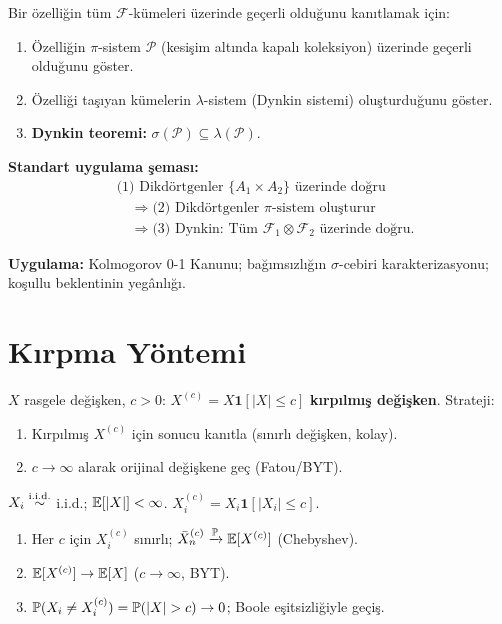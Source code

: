 Bir özelliğin tüm $\mathcal{F}$-kümeleri üzerinde geçerli olduğunu kanıtlamak için:

\begin{enumerate}
  \item Özelliğin $\pi$-sistem $\mathcal{P}$ (kesişim altında kapalı koleksiyon) üzerinde geçerli olduğunu göster.
  \item Özelliği taşıyan kümelerin $\lambda$-sistem (Dynkin sistemi) oluşturduğunu göster.
  \item \textbf{Dynkin teoremi:} $\sigma(\mathcal{P})\subseteq\lambda(\mathcal{P})$.
\end{enumerate}

\noindent\textbf{Standart uygulama şeması:}
\begin{align*}
  &\text{(1) Dikdörtgenler } \{A_1\times A_2\} \text{ üzerinde doğru} \\
  &\quad\Rightarrow \text{(2) Dikdörtgenler } \pi\text{-sistem oluşturur} \\
  &\quad\Rightarrow \text{(3) Dynkin: Tüm } \mathcal{F}_1\otimes\mathcal{F}_2 \text{ üzerinde doğru.}
\end{align*}

\noindent\textbf{Uygulama:} Kolmogorov 0-1 Kanunu; bağımsızlığın $\sigma$-cebiri karakterizasyonu; koşullu beklentinin yegânlığı.

\section{Kırpma Yöntemi}
\label{app:kirpma}

$X$ rasgele değişken, $c>0$: $X^{(c)} = X\mathbf{1}[|X|\leq c]$ \textbf{kırpılmış değişken}. Strateji:

\begin{enumerate}
  \item Kırpılmış $X^{(c)}$ için sonucu kanıtla (sınırlı değişken, kolay).
  \item $c\to\infty$ alarak orijinal değişkene geç (Fatou/BYT).
\end{enumerate}

\begin{ornek}
$X_i \overset{\text{i.i.d.}}{\sim}$ i.i.d.; $\mathbb{E}[|X|]<\infty$. $X_i^{(c)}=X_i\mathbf{1}[|X_i|\leq c]$.
\begin{enumerate}[(1)]
  \item Her $c$ için $X_i^{(c)}$ sınırlı; $\bar{X}_n^{(c)}\xrightarrow{\mathbb{P}}\mathbb{E}[X^{(c)}]$ (Chebyshev).
  \item $\mathbb{E}[X^{(c)}]\to\mathbb{E}[X]$ ($c\to\infty$, BYT).
  \item $\Prob(X_i\neq X_i^{(c)})=\Prob(|X|>c)\to0$; Boole eşitsizliğiyle geçiş.
\end{enumerate}
\end{ornek}

